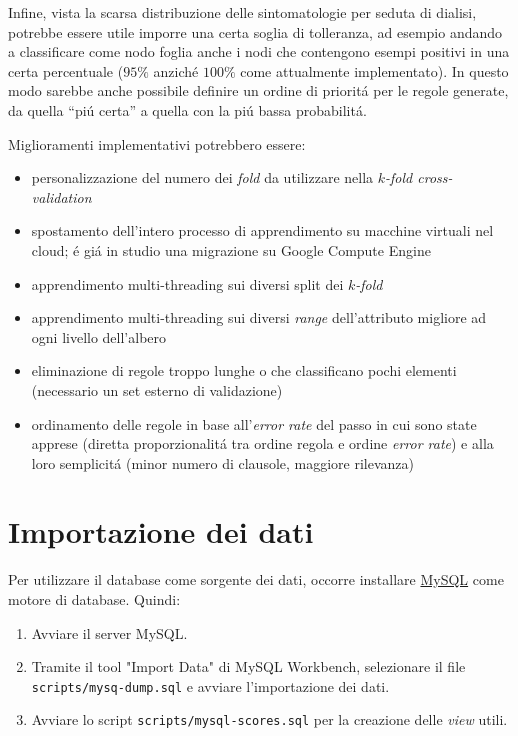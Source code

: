 \documentclass[preprint]{acm_proc_article-sp}
\begin{document}
Infine, vista la scarsa distribuzione delle sintomatologie per seduta di dialisi, potrebbe essere utile imporre una certa soglia di tolleranza, ad esempio andando a classificare come nodo foglia anche i nodi che contengono esempi positivi in una certa percentuale ($95\%$ anzich\'e $100\%$ come attualmente implementato). In questo modo sarebbe anche possibile definire un ordine di priorit\'a per le regole generate, da quella ``pi\'u certa'' a quella con la pi\'u bassa probabilit\'a.

Miglioramenti implementativi potrebbero essere:
\begin{itemize}
\item personalizzazione del numero dei \textit{fold} da utilizzare nella $k$\textit{-fold cross-validation}
\item spostamento dell'intero processo di apprendimento su macchine virtuali nel cloud; \'e gi\'a in studio una migrazione su Google Compute Engine
\item apprendimento multi-threading sui diversi split dei $k$\textit{-fold}
\item apprendimento multi-threading sui diversi \textit{range} dell'attributo migliore ad ogni livello dell'albero 
\item eliminazione di regole troppo lunghe o che classificano pochi elementi (necessario un set esterno di validazione)
\item ordinamento delle regole in base all'\textit{error rate} del passo in cui sono state apprese (diretta proporzionalit\'a tra ordine regola e ordine \textit{error rate}) e alla loro semplicit\'a (minor numero di clausole, maggiore rilevanza)
\end{itemize}



\appendix

\section{Importazione dei dati}
\label{appendix-data}
Per utilizzare il database come sorgente dei dati, occorre installare \href{http://www.mysql.com/}{MySQL} come motore di database.
Quindi:

\begin{enumerate}
\item Avviare il server MySQL.
\item Tramite il tool "Import Data" di MySQL Workbench, selezionare il file \verb|scripts/mysq-dump.sql| e avviare l'importazione dei dati.
\item Avviare lo script \verb|scripts/mysql-scores.sql| per la creazione delle \textit{view} utili.
\end{enumerate}
\end{document}
